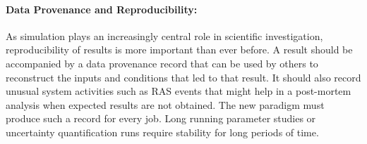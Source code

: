 \documentclass[10pt]{article}
\newcommand{\ngrm}{NGRM}
\begin{document}
\paragraph{Data Provenance and Reproducibility:}
As simulation plays an increasingly central role in scientific
investigation, reproducibility of results is more important than ever
before. A result should be accompanied by a data provenance record that
can be used by others to reconstruct the inputs and conditions that led to
that result. It should also record unusual system activities 
such as RAS events that might help in a post-mortem analysis 
when expected results are not obtained.
The new paradigm must produce such a record for every job.
Long running parameter studies or uncertainty quantification runs
require stability for long periods of time. 
%


%
%
\end{document}
